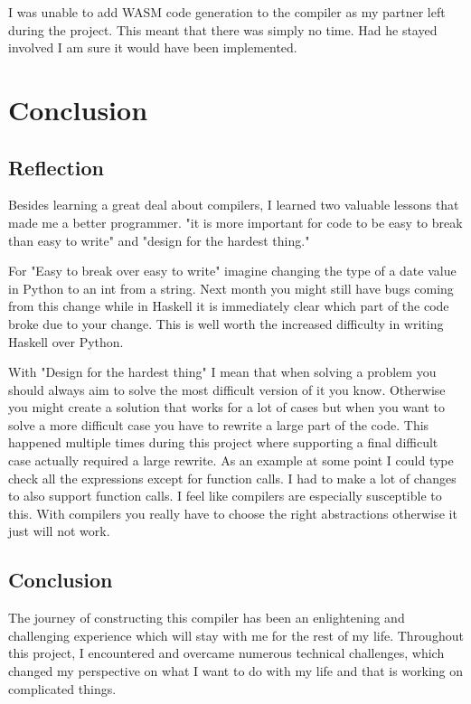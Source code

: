 \documentclass{report}
\begin{document}
I was unable to add WASM code generation to the compiler as my partner left during the project. This meant that there was simply no time. Had he stayed involved I am sure it would have been implemented.

\chapter{Conclusion}

\section{Reflection}

Besides learning a great deal about compilers, I learned two valuable lessons that made me a better programmer. "it is more important for code to be easy to break than easy to write" and "design for the hardest thing."

For "Easy to break over easy to write" imagine changing the type of a date value in Python to an int from a string. Next month you might still have bugs coming from this change while in Haskell it is immediately clear which part of the code broke due to your change. This is well worth the increased difficulty in writing Haskell over Python.

With "Design for the hardest thing" I mean that when solving a problem you should always aim to solve the most difficult version of it you know. Otherwise you might create a solution that works for a lot of cases but when you want to solve a more difficult case you have to rewrite a large part of the code. This happened multiple times during this project where supporting a final difficult case actually required a large rewrite. As an example at some point I could type check all the expressions except for function calls. I had to make a lot of changes to also support function calls. I feel like compilers are especially susceptible to this. With compilers you really have to choose the right abstractions otherwise it just will not work. 

\section{Conclusion}

The journey of constructing this compiler has been an enlightening and challenging experience which will stay with me for the rest of my life. Throughout this project, I encountered and overcame numerous technical challenges, which changed my perspective on what I want to do with my life and that is working on complicated things. 
\end{document}
